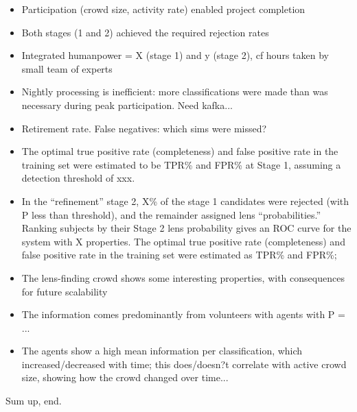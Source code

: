\documentclass[useAMS,usenatbib,a4paper]{mn2e}
\begin{document}
\begin{itemize} 

\item Participation (crowd size, activity rate) enabled project completion

\item Both stages (1 and 2) achieved the required rejection rates

\item Integrated humanpower = X (stage 1) and y (stage 2), cf hours taken by
small team of experts 

\item Nightly processing is inefficient: more classifications were made than
was necessary during peak participation. Need kafka...

\item Retirement rate. False negatives: which sims were missed?

\item The optimal true positive rate (completeness) and false positive rate in
the training set were estimated to be TPR\% and FPR\% at Stage 1, assuming a
detection threshold of xxx.  

\item In the ``refinement'' stage 2, X\% of the stage 1 candidates were
rejected (with P less than threshold), and the remainder assigned lens
``probabilities.'' Ranking
subjects by their Stage 2 lens probability gives an ROC curve for the system
with X properties. The optimal true positive rate (completeness) and false
positive rate in the training set were estimated as TPR\% and FPR\%; 

\item The lens-finding crowd shows some interesting properties, with
consequences for future scalability

\item The information comes predominantly from volunteers with agents with P =
...

\item The agents show a high mean information per classification, which
increased/decreased with time; this does/doesn?t correlate with active crowd
size, showing how the crowd changed over time...

\end{itemize}

Sum up, end.

\end{document}
